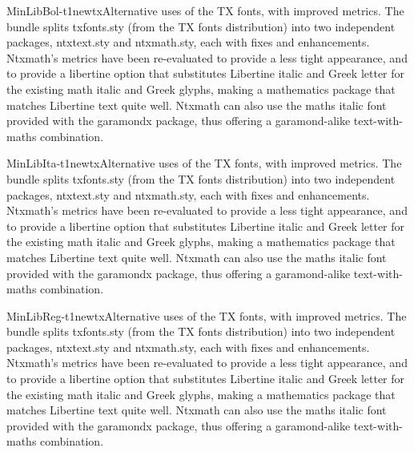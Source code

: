 \documentclass{ddltxtyp}
\begin{document}
\begin{package}{MinLibBol-t1}{newtx}{Alternative uses of the TX fonts, with improved metrics.}
The bundle splits txfonts.sty (from the TX fonts distribution)
into two independent packages, ntxtext.sty and ntxmath.sty,
each with fixes and enhancements. Ntxmath's metrics have been
re-evaluated to provide a less tight appearance, and to provide
a libertine option that substitutes Libertine italic and Greek
letter for the existing math italic and Greek glyphs, making a
mathematics package that matches Libertine text quite well.
Ntxmath can also use the maths italic font provided with the
garamondx package, thus offering a garamond-alike text-with-
maths combination.
\end{package}
\begin{package}{MinLibIta-t1}{newtx}{Alternative uses of the TX fonts, with improved metrics.}
The bundle splits txfonts.sty (from the TX fonts distribution)
into two independent packages, ntxtext.sty and ntxmath.sty,
each with fixes and enhancements. Ntxmath's metrics have been
re-evaluated to provide a less tight appearance, and to provide
a libertine option that substitutes Libertine italic and Greek
letter for the existing math italic and Greek glyphs, making a
mathematics package that matches Libertine text quite well.
Ntxmath can also use the maths italic font provided with the
garamondx package, thus offering a garamond-alike text-with-
maths combination.
\end{package}
\begin{package}{MinLibReg-t1}{newtx}{Alternative uses of the TX fonts, with improved metrics.}
The bundle splits txfonts.sty (from the TX fonts distribution)
into two independent packages, ntxtext.sty and ntxmath.sty,
each with fixes and enhancements. Ntxmath's metrics have been
re-evaluated to provide a less tight appearance, and to provide
a libertine option that substitutes Libertine italic and Greek
letter for the existing math italic and Greek glyphs, making a
mathematics package that matches Libertine text quite well.
Ntxmath can also use the maths italic font provided with the
garamondx package, thus offering a garamond-alike text-with-
maths combination.
\end{package}
\end{document}

